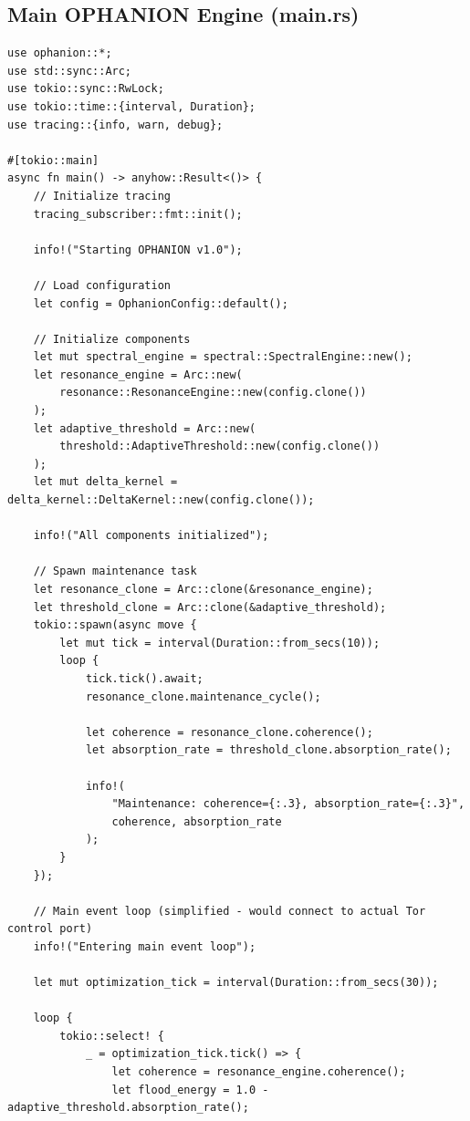 \documentclass[11pt,a4paper]{article}
\begin{document}
\subsection{Main OPHANION Engine (main.rs)}

\begin{lstlisting}[style=rust]
use ophanion::*;
use std::sync::Arc;
use tokio::sync::RwLock;
use tokio::time::{interval, Duration};
use tracing::{info, warn, debug};

#[tokio::main]
async fn main() -> anyhow::Result<()> {
    // Initialize tracing
    tracing_subscriber::fmt::init();
    
    info!("Starting OPHANION v1.0");
    
    // Load configuration
    let config = OphanionConfig::default();
    
    // Initialize components
    let mut spectral_engine = spectral::SpectralEngine::new();
    let resonance_engine = Arc::new(
        resonance::ResonanceEngine::new(config.clone())
    );
    let adaptive_threshold = Arc::new(
        threshold::AdaptiveThreshold::new(config.clone())
    );
    let mut delta_kernel = delta_kernel::DeltaKernel::new(config.clone());
    
    info!("All components initialized");
    
    // Spawn maintenance task
    let resonance_clone = Arc::clone(&resonance_engine);
    let threshold_clone = Arc::clone(&adaptive_threshold);
    tokio::spawn(async move {
        let mut tick = interval(Duration::from_secs(10));
        loop {
            tick.tick().await;
            resonance_clone.maintenance_cycle();
            
            let coherence = resonance_clone.coherence();
            let absorption_rate = threshold_clone.absorption_rate();
            
            info!(
                "Maintenance: coherence={:.3}, absorption_rate={:.3}",
                coherence, absorption_rate
            );
        }
    });
    
    // Main event loop (simplified - would connect to actual Tor control port)
    info!("Entering main event loop");
    
    let mut optimization_tick = interval(Duration::from_secs(30));
    
    loop {
        tokio::select! {
            _ = optimization_tick.tick() => {
                let coherence = resonance_engine.coherence();
                let flood_energy = 1.0 - adaptive_threshold.absorption_rate();
                

\end{lstlisting}
\end{document}
